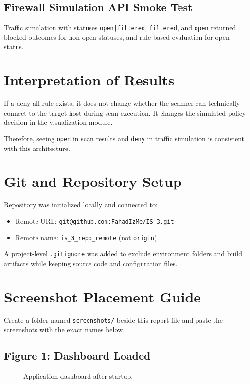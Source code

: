 \documentclass[12pt,a4paper]{article}
\begin{document}
\subsection{Firewall Simulation API Smoke Test}
Traffic simulation with statuses \texttt{open|filtered}, \texttt{filtered}, and \texttt{open} returned blocked outcomes for non-open statuses, and rule-based evaluation for open status.

\section{Interpretation of Results}
If a deny-all rule exists, it does not change whether the scanner can technically connect to the target host during scan execution. It changes the simulated policy decision in the visualization module.

Therefore, seeing \texttt{open} in scan results and \texttt{deny} in traffic simulation is consistent with this architecture.

\section{Git and Repository Setup}
Repository was initialized locally and connected to:
\begin{itemize}[leftmargin=*]
  \item Remote URL: \texttt{git@github.com:FahadIzMe/IS\_3.git}
  \item Remote name: \texttt{is\_3\_repo\_remote} (not \texttt{origin})
\end{itemize}

A project-level \texttt{.gitignore} was added to exclude environment folders and build artifacts while keeping source code and configuration files.

\section{Screenshot Placement Guide}
Create a folder named \texttt{screenshots/} beside this report file and paste the screenshots with the exact names below.

\subsection*{Figure 1: Dashboard Loaded}
\begin{figure}[H]
\centering
{}
\caption{Application dashboard after startup.}
\end{figure}
\end{document}
